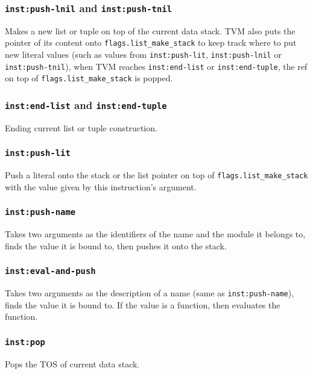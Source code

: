 \documentclass{article}
\newcommand{\inst}[1] {\texttt{inst:#1}}
\begin{document}
\subsubsection{\inst{push-lnil} and \inst{push-tnil}}

Makes a new list or tuple on top of the current data stack. TVM also puts the pointer of its content onto \texttt{flags.list\_make\_stack} to keep track where to put new literal values (such as values from \inst{push-lit}, \inst{push-lnil} or \inst{push-tnil}), when TVM reaches \inst{end-list} or \inst{end-tuple}, the ref on top of \texttt{flags.list\_make\_stack} is popped.

\subsubsection{\inst{end-list} and \inst{end-tuple}}

Ending current list or tuple construction.

\subsubsection{\inst{push-lit}}

Push a literal onto the stack or the list pointer on top of \texttt{flags.list\_make\_stack} with the value given by this instruction's argument.

\subsubsection{\inst{push-name}}

Takes two arguments as the identifiers of the name and the module it belongs to, finds the value it is bound to, then pushes it onto the stack.

\subsubsection{\inst{eval-and-push}}

Takes two arguments as the description of a name (same as \inst{push-name}), finds the value it is bound to. If the value is a function, then evaluates the function.

\subsubsection{\inst{pop}}

Pops the TOS of current data stack.
\end{document}
